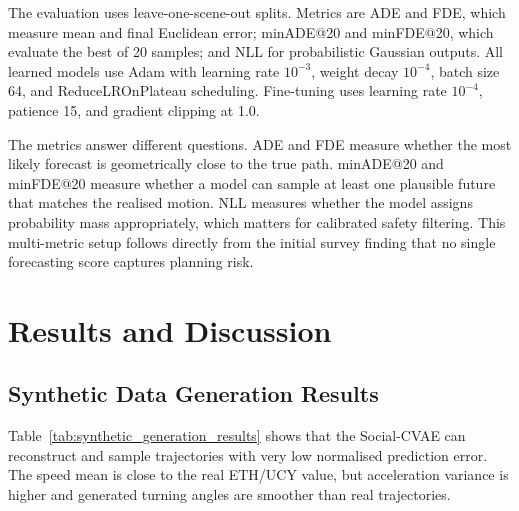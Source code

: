 \documentclass[conference]{IEEEtran}
\begin{document}
The evaluation uses leave-one-scene-out splits. Metrics are ADE and FDE, which measure
mean and final Euclidean error; minADE@20 and minFDE@20, which evaluate the
best of 20 samples; and NLL for probabilistic Gaussian outputs. All learned
models use Adam with learning rate $10^{-3}$, weight decay $10^{-4}$, batch
size 64, and ReduceLROnPlateau scheduling. Fine-tuning uses learning rate
$10^{-4}$, patience 15, and gradient clipping at 1.0.

The metrics answer different questions. ADE and FDE measure whether the most
likely forecast is geometrically close to the true path. minADE@20 and
minFDE@20 measure whether a model can sample at least one plausible future that
matches the realised motion. NLL measures whether the model assigns probability
mass appropriately, which matters for calibrated safety filtering. This
multi-metric setup follows directly from the initial survey finding that no single
forecasting score captures planning risk.

\section{Results and Discussion}

\subsection{Synthetic Data Generation Results}

Table~\ref{tab:synthetic_generation_results} shows that the Social-CVAE can
reconstruct and sample trajectories with very low normalised prediction error.
The speed mean is close to the real ETH/UCY value, but acceleration variance is
higher and generated turning angles are smoother than real trajectories.

\begin{table}[H]
\centering
\caption{Synthetic trajectory generation results. Lower ADE/FDE values are better.}
\label{tab:synthetic_generation_results}
\end{table}
\end{document}
